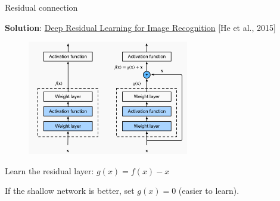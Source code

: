 \documentclass[usenames,dvipsnames,notes,11pt,aspectratio=169,hyperref={colorlinks=true, linkcolor=blue}]{beamer}
\begin{document}
\begin{frame}
    {Residual connection}

    \textbf{Solution}: \href{https://arxiv.org/pdf/1512.03385.pdf}{Deep Residual Learning for Image Recognition} [He et al., 2015]\\
    \begin{figure}
        \includegraphics[height=5cm]{figures/residual}
    \end{figure}

    Learn the residual layer: $g(x) = f(x) - x$

    If the shallow network is better, set $g(x)=0$ (easier to learn).
\end{frame}
\end{document}
